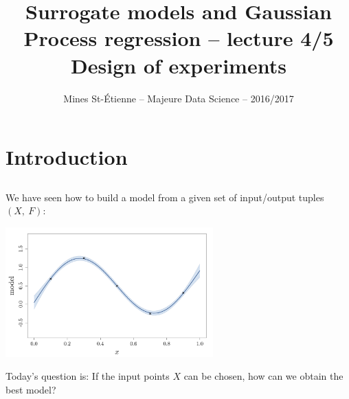 \documentclass{beamer}
\title[Majeure Data Science -- Surrogate models and GPR]{\texorpdfstring{ \small Surrogate models and Gaussian Process regression -- lecture 4/5 \\ \vspace{3mm} \LARGE Design of experiments}{}}
\author[Mines St-\'Etienne ]{Mines St-\'Etienne -- Majeure Data Science -- 2016/2017}
\institute{\texorpdfstring{Nicolas Durrande (durrande@emse.fr)}{}}
\date{\null}
\begin{document}

\begin{frame}
  \titlepage
\end{frame}

\section[Intro.]{Introduction}
\subsection{}


\begin{frame}{}
We have seen how to build a model from a given set of input/output tuples $(X,\ F)$:
\begin{center}
\includegraphics[height=5cm]{figures/R/model_0}
\end{center}
Today's question is: If the input points $X$ can be chosen, how can we obtain the best model?
\end{frame}
\end{document}
